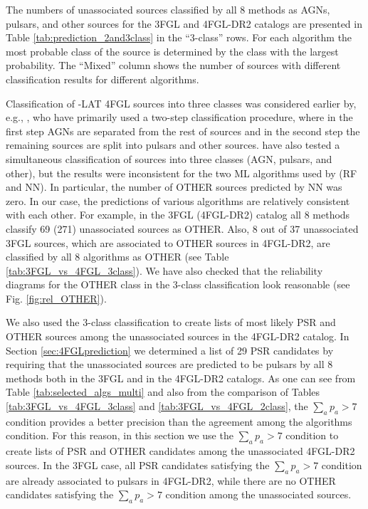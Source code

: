 The numbers of unassociated sources classified by all 8 methods as AGNs, pulsars, and other sources for the 3FGL and 4FGL-DR2 catalogs are presented in Table \ref{tab:prediction_2and3class} in the ``3-class'' rows.
For each algorithm the most probable class of the source is determined by the class with the largest probability.
The ``Mixed'' column shows the number of sources with different classification results for different algorithms.

Classification of \Fermi-LAT 4FGL sources into three classes was considered earlier by, e.g., \cite{2021RAA....21...15Z}, 
who have primarily used a two-step classification procedure, where in the first step AGNs are separated from the rest of sources and in the second step the remaining sources are split into pulsars and other sources.
\cite{2021RAA....21...15Z} have also tested a simultaneous classification of sources into three classes (AGN, pulsars, and other),
but the results were inconsistent for the two ML algorithms used by \cite{2021RAA....21...15Z} (RF and NN).
In particular, the number of OTHER sources predicted by NN was zero.
In our case, the predictions of various algorithms are relatively consistent with each other.
For example, in the 3FGL (4FGL-DR2) catalog all 8 methods classify 69 (271) unassociated sources as OTHER.
Also, 8 out of 37 unassociated 3FGL sources, which are associated to OTHER sources in 4FGL-DR2, are classified by all 8 algorithms as
OTHER (see Table \ref{tab:3FGL_vs_4FGL_3class}).
We have also checked that the reliability diagrams for the OTHER class in the 3-class classification look reasonable
(see Fig. \ref{fig:rel_OTHER}).

We also used the 3-class classification to create lists of most likely PSR and OTHER sources among the unassociated
sources in the 4FGL-DR2 catalog.
In Section \ref{sec:4FGLprediction} we determined a list of 29 PSR candidates by requiring that 
the unassociated sources are predicted to be pulsars by all 8 methods both in the 3FGL and in the 4FGL-DR2 catalogs.
As one can see from Table \ref{tab:selected_algs_multi} and also from the comparison of Tables \ref{tab:3FGL_vs_4FGL_3class}
and \ref{tab:3FGL_vs_4FGL_2class}, the $\sum_a p_a > 7$ condition provides a better precision than the 
agreement among the algorithms condition.
For this reason, in this section we use the $\sum_a p_a > 7$ condition to create lists of PSR and OTHER candidates
among the unassociated 4FGL-DR2 sources.
In the 3FGL case, all PSR candidates satisfying the $\sum_a p_a > 7$ condition are already associated to pulsars in 4FGL-DR2,
while there are no OTHER candidates satisfying the $\sum_a p_a > 7$ condition among the unassociated sources. 

